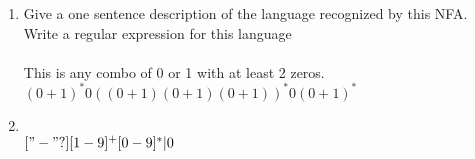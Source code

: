 \documentclass[11pt]{article}
\begin{document}
\begin{enumerate}
\item Give a one sentence description of the language recognized by this NFA. Write a regular expression for this language\\
\\
This is any combo of 0 or 1 with at least 2 zeros.\\

$(0+1)^*0((0+1)(0+1)(0+1))^*0(0+1)^*$\\

\item 
\\
$["-"?][1-9]^+[0-9]^*|0$\\


\end{enumerate}
\end{document}

